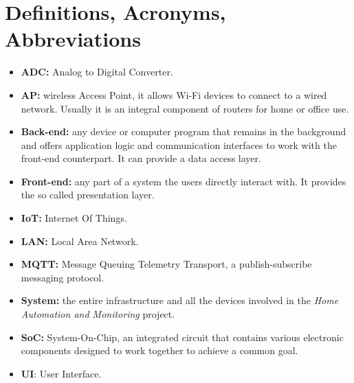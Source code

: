 \section{Definitions, Acronyms, Abbreviations}

\begin{itemize}
	\item \textbf{ADC:} Analog to Digital Converter.
	\item \textbf{AP:} wireless Access Point, it allows Wi-Fi devices to connect to a wired network. Usually it is an integral component of routers for home or office use.
	\item \textbf{Back-end:} any device or computer program that remains in the background and offers application logic and communication interfaces to work with the front-end counterpart. It can provide a data access layer.
	\item \textbf{Front-end:} any part of a system the users directly interact with. It provides the so called presentation layer.
	\item \textbf{IoT:} Internet Of Things.
	\item \textbf{LAN:} Local Area Network.
	\item \textbf{MQTT:} Message Queuing Telemetry Transport, a publish-subscribe messaging protocol.
	\item \textbf{System:} the entire infrastructure and all the devices involved in the \textit{Home Automation and Monitoring} project.
	\item \textbf{SoC:} System-On-Chip, an integrated circuit that contains various electronic components designed to work together to achieve a common goal.
	\item \textbf{UI}: User Interface.
\end{itemize}